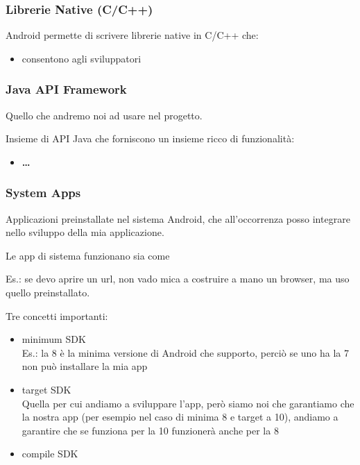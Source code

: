 \subsubsection{Librerie Native (C/C++)}
\par Android permette di scrivere librerie native in C/C++ che:
\begin{itemize}
    \item consentono agli sviluppatori 
\end{itemize}

\subsubsection{Java API Framework}
\par Quello che andremo noi ad usare nel progetto.
\par Insieme di API Java che forniscono un insieme ricco di funzionalità:
\begin{itemize}
    \item \textbf{\dots}
\end{itemize}

\subsubsection{System Apps}
\par Applicazioni preinstallate nel sistema Android, che all'occorrenza posso integrare nello sviluppo della mia applicazione.
\par Le app di sistema funzionano sia come 
\par Es.: se devo aprire un url, non vado mica a costruire a mano un browser, ma uso quello preinstallato.



Tre concetti importanti:
\begin{itemize}
    \item minimum SDK\\
    Es.: la 8 è la minima versione di Android che supporto, perciò se uno ha la 7 non può installare la mia app
    \item target SDK\\
    Quella per cui andiamo a sviluppare l'app, però siamo noi che garantiamo che la nostra app (per esempio nel caso di minima 8 e target a 10), andiamo a garantire che se funziona per la 10 funzionerà anche per la 8
    \item compile SDK
\end{itemize}


